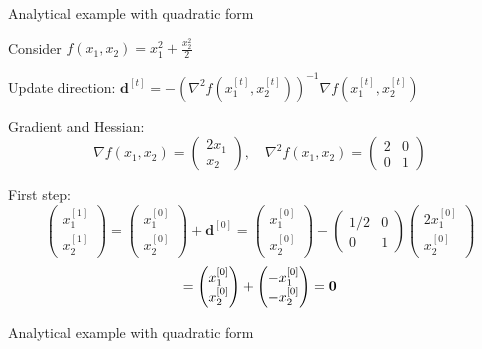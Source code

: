 \documentclass[11pt,compress,t,notes=noshow, xcolor=table]{beamer}
\begin{document}
\begin{framei}{Analytical example with quadratic form}
\item Consider $f(x_1, x_2) = x_1^2 + \frac{x_2^2}{2}$
\item Update direction: $\mathbf{d}^{[t]} = -(\nabla^2 f(x_1^{[t]}, x_2^{[t]}))^{-1} \nabla f(x_1^{[t]}, x_2^{[t]})$
\item Gradient and Hessian:
$$
\nabla f(x_1, x_2) = \begin{pmatrix}2x_1 \\ x_2\end{pmatrix}, \quad
\nabla^2 f(x_1, x_2) = \begin{pmatrix}2 & 0 \\ 0 & 1\end{pmatrix}
$$
\item First step:
$$
\begin{pmatrix}
x_1^{[1]} \\ x_2^{[1]}
\end{pmatrix} = \begin{pmatrix}
x_1^{[0]} \\ x_2^{[0]}
\end{pmatrix} + \mathbf{d}^{[0]} = \begin{pmatrix}
x_1^{[0]} \\ x_2^{[0]}
\end{pmatrix} - \begin{pmatrix}
1/2 &  0 \\ 0 & 1
\end{pmatrix} \begin{pmatrix}
2x_1^{[0]} \\ x_2^{[0]}
\end{pmatrix}
$$
$$
= \begin{pmatrix}
x_1^{[0]} \\ x_2^{[0]}
\end{pmatrix} + \begin{pmatrix}
-x_1^{[0]} \\
-x_2^{[0]}
\end{pmatrix} = \mathbf{0}
$$
\end{framei}


\begin{framev}{Analytical example with quadratic form}
\end{framev}
\end{document}
